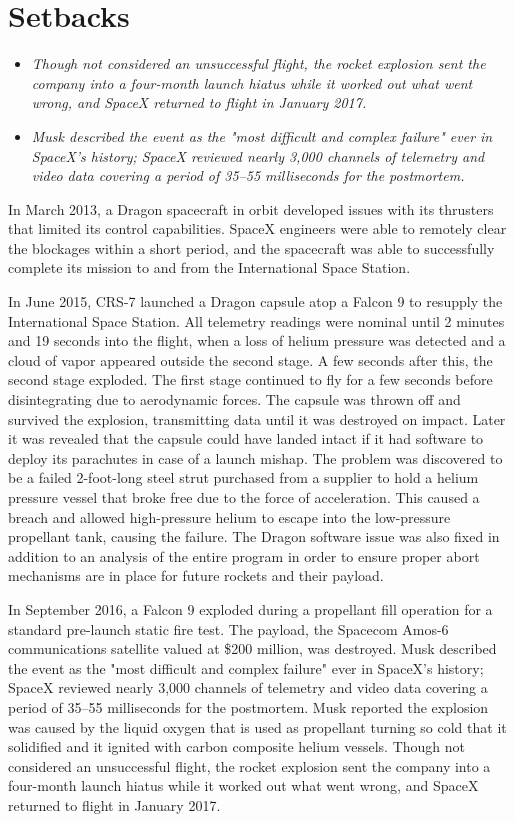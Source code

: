 \section{Setbacks}\label{setbacks}

\begin{itemize}
\item
  \emph{Though not considered an unsuccessful flight, the rocket
  explosion sent the company into a four-month launch hiatus while it
  worked out what went wrong, and SpaceX returned to flight in January
  2017.}
\item
  \emph{Musk described the event as the "most difficult and complex
  failure" ever in SpaceX's history; SpaceX reviewed nearly 3,000
  channels of telemetry and video data covering a period of 35--55
  milliseconds for the postmortem.}
\end{itemize}

In March 2013, a Dragon spacecraft in orbit developed issues with its
thrusters that limited its control capabilities. SpaceX engineers were
able to remotely clear the blockages within a short period, and the
spacecraft was able to successfully complete its mission to and from the
International Space Station.

In June 2015, CRS-7 launched a Dragon capsule atop a Falcon 9 to
resupply the International Space Station. All telemetry readings were
nominal until 2 minutes and 19 seconds into the flight, when a loss of
helium pressure was detected and a cloud of vapor appeared outside the
second stage. A few seconds after this, the second stage exploded. The
first stage continued to fly for a few seconds before disintegrating due
to aerodynamic forces. The capsule was thrown off and survived the
explosion, transmitting data until it was destroyed on impact. Later it
was revealed that the capsule could have landed intact if it had
software to deploy its parachutes in case of a launch mishap. The
problem was discovered to be a failed 2-foot-long steel strut purchased
from a supplier to hold a helium pressure vessel that broke free due to
the force of acceleration. This caused a breach and allowed
high-pressure helium to escape into the low-pressure propellant tank,
causing the failure. The Dragon software issue was also fixed in
addition to an analysis of the entire program in order to ensure proper
abort mechanisms are in place for future rockets and their payload.

In September 2016, a Falcon 9 exploded during a propellant fill
operation for a standard pre-launch static fire test. The payload, the
Spacecom Amos-6 communications satellite valued at \$200 million, was
destroyed. Musk described the event as the "most difficult and complex
failure" ever in SpaceX's history; SpaceX reviewed nearly 3,000 channels
of telemetry and video data covering a period of 35--55 milliseconds for
the postmortem. Musk reported the explosion was caused by the liquid
oxygen that is used as propellant turning so cold that it solidified and
it ignited with carbon composite helium vessels. Though not considered
an unsuccessful flight, the rocket explosion sent the company into a
four-month launch hiatus while it worked out what went wrong, and SpaceX
returned to flight in January 2017.


